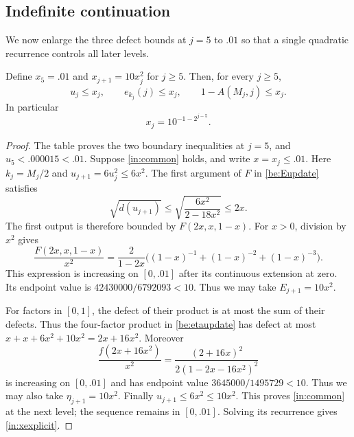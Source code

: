 \subsection{Indefinite continuation}
We now enlarge the three defect bounds at $j=5$ to $.01$ so that a
single quadratic recurrence controls all later levels.

\begin{proposition}\label{in:quadratic}
Define $x_5=.01$ and $x_{j+1}=10x_j^2$ for $j\ge5$. Then, for every
$j\ge5$,
\begin{equation}\label{in:common}
 u_j\le x_j,\qquad e_{k_j}(j)\le x_j,\qquad
 1-A(M_j,j)\le x_j.
\end{equation}
In particular
\begin{equation}\label{in:xexplicit}
 x_j=10^{-1-2^{j-5}}.
\end{equation}
\end{proposition}
\begin{proof}
The table proves the two boundary inequalities at $j=5$, and
$u_5<.000015<.01$. Suppose \eqref{in:common} holds, and write
$x=x_j\le.01$. Here $k_j=M_j/2$ and $u_{j+1}=6u_j^2\le6x^2$.
The first argument of $F$ in \eqref{be:Eupdate} satisfies
\[
 \sqrt{d(u_{j+1})}\le
 \sqrt{\frac{6x^2}{2-18x^2}}\le2x.
\]
The first output is therefore bounded by
$F(2x,x,1-x)$. For $x>0$, division by $x^2$ gives
\[
 \frac{F(2x,x,1-x)}{x^2}
 =\frac{2}{1-2x}\bigl((1-x)^{-1}+(1-x)^{-2}+(1-x)^{-3}\bigr).
\]
This expression is increasing on $[0,.01]$ after its continuous
extension at zero. Its endpoint value is
$42430000/6792093<10$. Thus we may take $E_{j+1}=10x^2$.

For factors in $[0,1]$, the defect of their product is at most the sum
of their defects. Thus the four-factor product in \eqref{be:etaupdate}
has defect at most $x+x+6x^2+10x^2=2x+16x^2$. Moreover
\[
 \frac{f(2x+16x^2)}{x^2}
 =\frac{(2+16x)^2}{2(1-2x-16x^2)^2}
\]
is increasing on $[0,.01]$ and has endpoint value
$3645000/1495729<10$. Thus we may also take
$\eta_{j+1}=10x^2$. Finally $u_{j+1}\le6x^2\le10x^2$.
This proves \eqref{in:common} at the next level; the sequence remains
in $[0,.01]$. Solving its recurrence gives \eqref{in:xexplicit}.
\end{proof}
